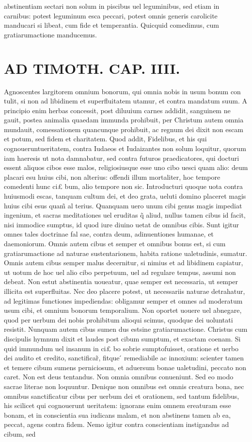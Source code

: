 \documentclass{article}
\begin{document}
\begin{pages}
abstinentiam sectari non solum in piscibus uel leguminibus, sed etiam in carnibus: potest leguminum esca peccari, potest omnis generis carolicite manducari si libeat, cum fide et temperantia. Quicquid comedimus, cum gratiarumactione manducemus.  \pend
\section*{AD TIMOTH. CAP. IIII. }
\marginpar{[ p.507 ]}\pstart Agnoscentes largitorem omnium bonorum, qui omnia nobis in usum bonum con tulit, si non ad libidinem et superfluitatem utamur, et contra mandatum suum. A principio enim herbas concessit, post diluuium carnes addidit, sanguinem ne gauit, postea animalia quaedam immunda prohibuit, per Christum autem omnia mundauit, comessationem quancunque prohibuit, ac regnum dei dixit non escam et potum, sed fidem et charitatem. Quod addit, Fidelibus, et his qui cognoueruntueritatem, contra Iudaeos et Iudaizantes non solum loquitur, quorum iam haeresis ut nota damnabatur, sed contra futuros praedicatores, qui docturi essent aliquos cibos esse malos, religiosiusque esse uno cibo uesci quam alio: deum placari esu huius cibi, non alterius: offendi illum mortaliter, hoc tempore comedenti hunc ci£ bum, alio tempore non sic. Introducturi quoque uota contra huiusmodi escas, tanquam cultum dei, et deo grata, ueluti domino placeret magis huius cibi esus quam̃ al terius. Quanquam uero unum cibi genus magis impediat ingenium, et sacras meditationes uel eruditas q̃ aliud, nullus tamen cibus id facit, nisi immodice sumptus, id quod iure diuino uetat de omnibus cibis. Sunt igitur omnes tales doctrinae fal sae, contra deum, adinuentiones humanae, et daemoniorum. Omnis autem cibus et semper et omnibus bonus est, si cum gratiarumactione ad naturae sustentarionem, habita ratione ualetudinis, sumatur. Omnis autem cibus semper malus decernitur, si nimius et ad libidinem capiatur, ut uotum de hoc uel alio cibo perpetuum, uel ad regulare tempus, assumi non debeat. Non estut abstinentia uoueatur, quae semper est necessaria, ut semper illicita est superfluitas. Nec deo placere potest, ut necessariis naturae detrahatur, ad legitimas functiones impediendas: obligamur semper et omnes ad moderatum usum cibi, et omnium bonorum temporalium. Non oportet uouere uel abnegare, quod per uerbum dei nobis prohibitum alioqui scimus, quodque dei uoluntati resistit. Nunquam autem cibus sumen dus estsine gratiarumactione. Christus cum discipulis hymnum dixit et laudes post cibum sumptum, et exactam coenam. Si quid immundum uel insanum in ci£ bo sobrie sumptofuisset, oratione et uerbo dei audito et credito, sanctificar̃, fitque ́ remediabile ac innoxium: scienter tamen et temere cibum sumens perniciosum, et aduersum bonae ualetudini, peccato non caret. Non est deus tentandus. Non omnia omnibus conueniunt. Sed eo modo sacrae literae non loquuntur. Denique  non omnibus est omnis creatura bona, nec omnibus sanctificatur cibus per uerbum dei et orationem, sed tantum fidelibus, his scilicet qui cognouerunt ueritatem: ignorans enim omnem ereaturam esse bonam, et in conscientia sua iudicans malam, et non abstinens tamen ab ea, peccat, agens contra fidem. Nemo igitur contra conscientiam instigandus ad cibum, sed 
\end{pages}
\end{document}

